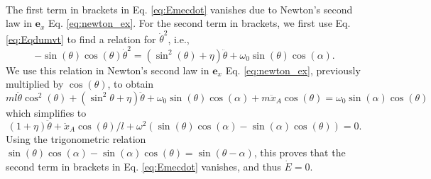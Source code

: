 \documentclass[11pt,a4paper]{exam}
\newcommand{\exACDH}{\bm e_x}
\begin{document}
\begin{parts}
\begin{align}
        \label{eq:Emecdot}
    \end{align}
    The first term in brackets in Eq. \eqref{eq:Emecdot} vanishes due to Newton's second law in $\exACDH$ Eq. \eqref{eq:newton_ex}.
    For the second term in brackets, we first use Eq. \eqref{eq:Eqdumvt} to find a relation for $\dot\theta^2$, i.e.,
    $$
    -\sin(\theta)\cos(\theta)\dot\theta^2 = (\sin^2(\theta)+\eta)\ddot\theta + \omega_0\sin(\theta)\cos(\alpha).
    $$
    We use this relation in Newton's second law in $\exACDH$ Eq. \eqref{eq:newton_ex}, previously multiplied by $\cos(\theta)$, to obtain
    $$
    ml\ddot\theta \cos^2(\theta) + (\sin^2\theta+\eta)\ddot\theta + \omega_0\sin(\theta)\cos(\alpha) + m \ddot x_A \cos(\theta) = \omega_0 \sin(\alpha)\cos(\theta) 
    $$
    which simplifies to 
    $$
    (1+\eta)\ddot\theta + \ddot x_A \cos(\theta)/l + \omega^2 (\sin(\theta)\cos(\alpha) - \sin(\alpha)\cos(\theta)) = 0.
    $$
    Using the trigonometric relation $\sin(\theta)\cos(\alpha) - \sin(\alpha)\cos(\theta)=\sin(\theta-\alpha)$, this proves that the second term in brackets in Eq. \eqref{eq:Emecdot} vanishes, and thus $\dot E = 0$.

\end{parts}
\end{document}
